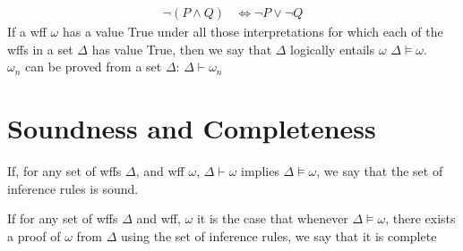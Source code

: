 \documentclass[a4paper]{article}
\begin{document}
\begin{align}
  \lnot (P \land Q) &\Leftrightarrow \lnot P \lor \lnot Q
\end{align}
If a wff $\omega$ has a value True under all those interpretations for which
each of the wffs in a set $\Delta$ has value True, then we say that $\Delta$
logically entails $\omega$ $\Delta \models \omega$.\\
$\omega_n$ can be proved from a set $\Delta$: $\Delta \vdash \omega_n$
\section{Soundness and Completeness}
\begin{framed}
  If, for any set of wffs $\Delta$, and wff $\omega$, $\Delta \vdash \omega$
  implies $\Delta \models \omega$, we say that the set of inference rules is
  sound.
\end{framed}

\begin{framed}
  If for any set of wffs $\Delta$ and wff, $\omega$ it is the case that whenever
  $\Delta \models \omega$, there exists a proof of $\omega$ from $\Delta$ using
  the set of inference rules, we say that it is complete
\end{framed}
\end{document}
